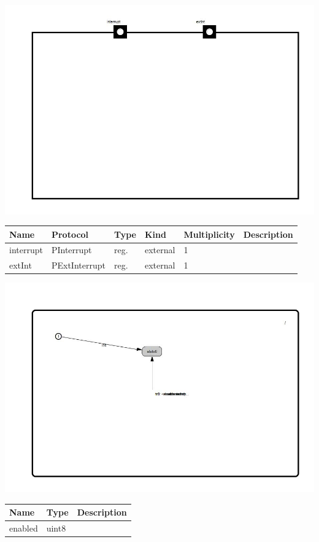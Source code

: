 
{
\centering{}
\includegraphics[width=1.0\textwidth]{./images/AExtInt_structure.jpg}
}

\begin{tabular}[ht]{|l|l|l|l|l|p{5cm}|}
\hline
\textbf{Name} & \textbf{Protocol} & \textbf{Type} & \textbf{Kind} & \textbf{Multiplicity} & \textbf{Description}\\
\hline
interrupt & PInterrupt & reg. & external & 1 & \\
\hline
extInt & PExtInterrupt & reg. & external & 1 & \\
\hline
\end{tabular}

{
\centering{}
\includegraphics[width=1.0\textwidth]{./images/AExtInt_behavior.jpg}
}

\begin{par}

\end{par}


\begin{tabular}[ht]{|l|l|p{8cm}|}
\hline
\textbf{Name} & \textbf{Type} & \textbf{Description}\\
\hline
enabled & uint8 & \\
\hline
\end{tabular}

